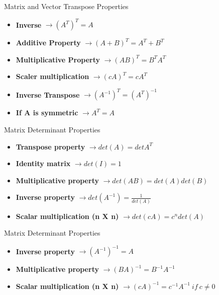 \documentclass[
  ignorenonframetext,
]{beamer}
\begin{document}
\begin{frame}{Matrix and Vector Transpose Properties}
\protect\hypertarget{matrix-and-vector-transpose-properties}{}

\begin{itemize}
\item
  \textbf{Inverse} \(\rightarrow (A^{T})^{T} = A\)
\item
  \textbf{Additive Property} \(\rightarrow (A+B)^{T} =  A^{T}+B^{T}\)
\item
  \textbf{Multiplicative Property} \(\rightarrow (AB)^{T} =B^{T}A^{T}\)
\item
  \textbf{Scaler multiplication} \(\rightarrow (cA)^{T} =cA^{T}\)
\item
  \textbf{Inverse Transpose} \(\rightarrow (A^{-1})^{T} = (A^{T})^{-1}\)
\item
  \textbf{If A is symmetric} \(\rightarrow A^{T}= A\)
\end{itemize}

\end{frame}

\begin{frame}{Matrix Determinant Properties}
\protect\hypertarget{matrix-determinant-properties}{}

\begin{itemize}
\item
  \textbf{Transpose property} \(\rightarrow det(A) = detA^{T}\)
\item
  \textbf{Identity matrix} \(\rightarrow det(I) = 1\)
\item
  \textbf{Multiplicative property}
  \(\rightarrow det(AB) = det(A)det(B)\)
\item
  \textbf{Inverse property}
  \(\rightarrow det(A^{-1}) = \frac{1}{det(A)}\)
\item
  \textbf{Scalar multiplication (n X n)}
  \(\rightarrow det(cA) = c^{n}det(A)\)
\end{itemize}

\end{frame}

\begin{frame}{Matrix Determinant Properties}
\protect\hypertarget{matrix-determinant-properties-1}{}

\begin{itemize}
\item
  \textbf{Inverse property} \(\rightarrow (A^{-1})^{-1} = A\)
\item
  \textbf{Multiplicative property}
  \(\rightarrow (BA)^{-1} = B^{-1}A^{-1}\)
\item
  \textbf{Scalar multiplication (n X n)}
  \(\rightarrow (cA)^{-1} = c^{-1}A^{-1} \: if \: c \neq 0\)
\end{itemize}

\end{frame}
\end{document}
